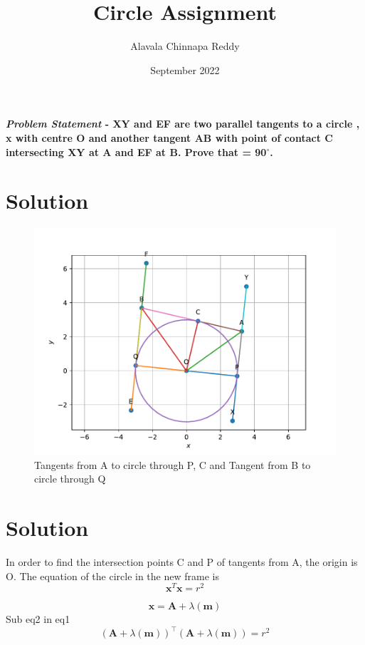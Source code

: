 \documentclass[journal,10pt,twocolumn]{article}
\title{\textbf{Circle Assignment}}
\author{Alavala Chinnapa Reddy}
\date{September 2022}
\let\vec\mathbf
\begin{document}
\maketitle
\paragraph{\textit{Problem Statement} - XY and EF are two parallel tangents to a circle , x with centre O and another tangent AB with point of contact C intersecting XY at A and EF at B. Prove that  = 90$^{\circ}$.}
\section*{\large Solution}

\begin{figure}[H]
\centering
\includegraphics[width=1\columnwidth]{figs/c.pdf}
\caption{Tangents from A to circle through P, C and Tangent from B to circle through Q}
\end{figure}
\section*{Solution}
In order to find the intersection points C and P of tangents from A, the origin is  O. The equation of the circle in the new frame is
\begin{equation}
  \boldsymbol{x}^T\boldsymbol{x} = r^2
\end{equation}

\begin{equation}
	\boldsymbol{x} = \vec{A}+\lambda(\vec{m})
\end{equation}
Sub eq2 in eq1
\begin{equation}
	(\vec{A}+\lambda(\vec{m}))^\top(\vec{A}+\lambda(\vec{m}))=r^2
\end{equation}
\end{document}
